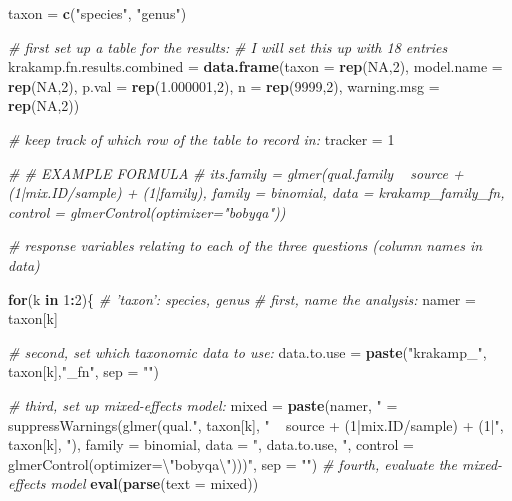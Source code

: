 \documentclass[
]{article}
\newenvironment{Shaded}{\begin{snugshade}}{\end{snugshade}}
\newcommand{\CharTok}[1]{\textcolor[rgb]{0.31,0.60,0.02}{#1}}
\newcommand{\CommentTok}[1]{\textcolor[rgb]{0.56,0.35,0.01}{\textit{#1}}}
\newcommand{\ControlFlowTok}[1]{\textcolor[rgb]{0.13,0.29,0.53}{\textbf{#1}}}
\newcommand{\DataTypeTok}[1]{\textcolor[rgb]{0.13,0.29,0.53}{#1}}
\newcommand{\DecValTok}[1]{\textcolor[rgb]{0.00,0.00,0.81}{#1}}
\newcommand{\FloatTok}[1]{\textcolor[rgb]{0.00,0.00,0.81}{#1}}
\newcommand{\KeywordTok}[1]{\textcolor[rgb]{0.13,0.29,0.53}{\textbf{#1}}}
\newcommand{\NormalTok}[1]{#1}
\newcommand{\OperatorTok}[1]{\textcolor[rgb]{0.81,0.36,0.00}{\textbf{#1}}}
\newcommand{\OtherTok}[1]{\textcolor[rgb]{0.56,0.35,0.01}{#1}}
\newcommand{\StringTok}[1]{\textcolor[rgb]{0.31,0.60,0.02}{#1}}
\begin{document}
\begin{Shaded}
\begin{Highlighting}[]
\NormalTok{taxon =}\StringTok{ }\KeywordTok{c}\NormalTok{(}\StringTok{"species"}\NormalTok{, }\StringTok{"genus"}\NormalTok{)}

\CommentTok{# first set up a table for the results:}
\CommentTok{# I will set this up with 18 entries}
\NormalTok{krakamp.fn.results.combined =}\StringTok{ }\KeywordTok{data.frame}\NormalTok{(}\DataTypeTok{taxon  =} \KeywordTok{rep}\NormalTok{(}\OtherTok{NA}\NormalTok{,}\DecValTok{2}\NormalTok{), }\DataTypeTok{model.name =} \KeywordTok{rep}\NormalTok{(}\OtherTok{NA}\NormalTok{,}\DecValTok{2}\NormalTok{), }\DataTypeTok{p.val  =} \KeywordTok{rep}\NormalTok{(}\FloatTok{1.000001}\NormalTok{,}\DecValTok{2}\NormalTok{), }\DataTypeTok{n  =} \KeywordTok{rep}\NormalTok{(}\DecValTok{9999}\NormalTok{,}\DecValTok{2}\NormalTok{), }\DataTypeTok{warning.msg =} \KeywordTok{rep}\NormalTok{(}\OtherTok{NA}\NormalTok{,}\DecValTok{2}\NormalTok{))}

\CommentTok{# keep track of which row of the table to record in:}
\NormalTok{tracker =}\StringTok{ }\DecValTok{1}

\CommentTok{# # EXAMPLE FORMULA}
\CommentTok{# its.family = glmer(qual.family ~ source + (1|mix.ID/sample) + (1|family), family = binomial, data = krakamp_family_fn, control = glmerControl(optimizer="bobyqa"))}

\CommentTok{# response variables relating to each of the three questions (column names in data)}

    \ControlFlowTok{for}\NormalTok{(k }\ControlFlowTok{in} \DecValTok{1}\OperatorTok{:}\DecValTok{2}\NormalTok{)\{ }\CommentTok{# 'taxon': species, genus}
        \CommentTok{# first, name the analysis:}
\NormalTok{        namer =}\StringTok{ }\NormalTok{taxon[k]}
        
        \CommentTok{# second, set which taxonomic data to use:}
\NormalTok{        data.to.use =}\StringTok{ }\KeywordTok{paste}\NormalTok{(}\StringTok{"krakamp_"}\NormalTok{, taxon[k],}\StringTok{"_fn"}\NormalTok{, }\DataTypeTok{sep =} \StringTok{""}\NormalTok{)}
        
        \CommentTok{# third, set up mixed-effects model: }
\NormalTok{        mixed =}\StringTok{ }\KeywordTok{paste}\NormalTok{(namer, }\StringTok{" = suppressWarnings(glmer(qual."}\NormalTok{, taxon[k],}
          \StringTok{" ~ source + (1|mix.ID/sample) + (1|"}\NormalTok{, taxon[k], }\StringTok{"), family = binomial, }
\StringTok{          data = "}\NormalTok{, data.to.use, }\StringTok{", control = glmerControl(optimizer=}\CharTok{\textbackslash{}"}\StringTok{bobyqa}\CharTok{\textbackslash{}"}\StringTok{)))"}\NormalTok{, }\DataTypeTok{sep =} \StringTok{""}\NormalTok{)}
        \CommentTok{# fourth, evaluate the mixed-effects model}
        \KeywordTok{eval}\NormalTok{(}\KeywordTok{parse}\NormalTok{(}\DataTypeTok{text =}\NormalTok{ mixed))}


\end{Highlighting}
\end{Shaded}
\end{document}
